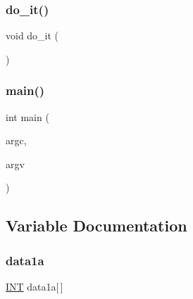 \subsubsection{\texorpdfstring{do\+\_\+it()}{do\_it()}}
{\footnotesize\ttfamily void do\+\_\+it (\begin{DoxyParamCaption}{ }\end{DoxyParamCaption})}

\mbox{\label{make__design_8_c_a3c04138a5bfe5d72780bb7e82a18e627}} 
\subsubsection{\texorpdfstring{main()}{main()}}
{\footnotesize\ttfamily int main (\begin{DoxyParamCaption}\item[{int}]{argc,  }\item[{char $\ast$$\ast$}]{argv }\end{DoxyParamCaption})}



\subsection{Variable Documentation}
\mbox{\label{make__design_8_c_af1d4f7e0ffa65fbc6361e81c142c2add}} 
\subsubsection{\texorpdfstring{data1a}{data1a}}
{\footnotesize\ttfamily \mbox{\hyperlink{galois_8h_a09fddde158a3a20bd2dcadb609de11dc}{I\+NT}} data1a\mbox{[}$\,$\mbox{]}}

